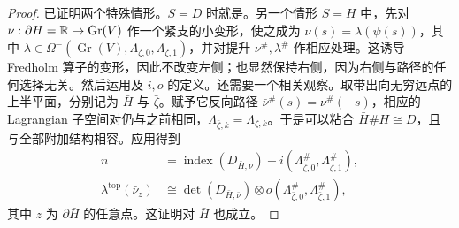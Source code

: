 \begin{proof}
已证明两个特殊情形。$S=D$ 时就是。另一个情形 $S=H$ 中，先对 $\nu:\partial H=\mathbb R\to\operatorname{Gr}(V)$ 作一个紧支的小变形，使之成为 $\nu(s)=\lambda(\psi(s))$，其中 $\lambda\in\Omega^-(\operatorname{Gr}(V),\allowbreak \Lambda_{\zeta,\allowbreak 0},\allowbreak \Lambda_{\zeta,\allowbreak 1})$，并对提升 $\nu^\#,\allowbreak \lambda^\#$ 作相应处理。这诱导 Fredholm 算子的变形，因此不改变左侧；也显然保持右侧，因为右侧与路径的任何选择无关。然后运用及 $i,\allowbreak o$ 的定义。还需要一个相关观察。取带出向无穷远点的上半平面，分别记为 $\bar H$ 与 $\bar\zeta$。赋予它反向路径 $\bar\nu^\#(s)=\nu^\#(-s)$，相应的 Lagrangian 子空间对仍与之前相同，$\Lambda_{\bar\zeta,\allowbreak k}=\Lambda_{\zeta,\allowbreak k}$。于是可以粘合 $\bar H\#H\cong D$，且与全部附加结构相容。应用得到
\begin{equation}\label{eq:11.27}
\begin{aligned}
n&=\operatorname{index}(D_{\bar H,\bar\nu})+i(\Lambda_{\bar\zeta,0}^\#,\Lambda_{\bar\zeta,1}^\#),\\
\lambda^{\mathrm{top}}(\bar\nu_z)&\cong\det(D_{\bar H,\bar\nu})\otimes o(\Lambda_{\bar\zeta,0}^\#,\Lambda_{\bar\zeta,1}^\#),
\end{aligned}
\end{equation}
其中 $z$ 为 $\partial\bar H$ 的任意点。这证明对 $\bar H$ 也成立。


\end{proof}
